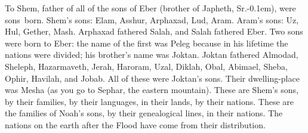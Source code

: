 \begin{inparaenum}
   To Shem, father of all of the sons of Eber (brother of Japheth, Sr.\kern-0.1em), were sons\understood\ born.%
   Shem's sons: Elam, Asshur, Arphaxad, Lud, Aram.%
   Aram's sons: Uz, Hul, Gether, Mash.%
   Arphaxad fathered Salah, and Salah fathered Eber.%
   Two sons were born to Eber: the name of the first was Peleg because in his lifetime the nations were divided; his brother's name was Joktan.%
   Joktan fathered Almodad, Sheleph, Hazarmaveth, Jerah,%
   Haroram, Uzal, Diklah,%
   Obal, Abimael, Sheba,%
   Ophir, Havilah, and Jobab. All of these were Joktan's sons.%
   Their dwelling-place was Mesha (as you go to Sephar, the eastern mountain).%
   These are Shem's sons, by their families, by their languages, in their lands, by their nations.%
   These are the families of Noah's sons, by their genealogical lines, in their nations. The nations on the earth after the Flood have come from their distribution.%
\end{inparaenum}

